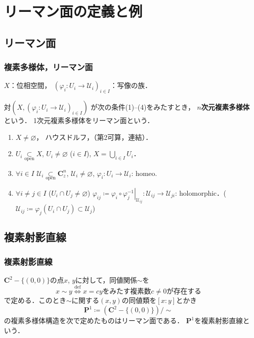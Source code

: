 \documentclass[dvipdfmx,12pt,aspectratio=169]{beamer}%
\newcommand{\cc}{\mathbf{C}}
\newcommand{\pp}{\mathbf{P}}
\newcommand{\mcal}{\mathcal}
\newcommand{\pphi}{\varphi} %
\newcommand{\UU}{\mcal{U}}
\newcommand{\emp}{\varnothing}
\newcommand{\ceq}{\coloneqq}
\newcommand{\sbs}{\subset}
\newcommand{\mapres}[2]{\left. #1 \right|_{#2}}
\begin{document}
\section{リーマン面の定義と例}
\subsection{リーマン面}

\begin{frame}
    \frametitle{複素多様体，リーマン面}

    \begin{Definition}
        $X$：位相空間，
        $(\pphi_i\colon U_i\to\UU_i)_{i\in I}$：写像の族．

        対$\left(X, (\pphi_i\colon U_i\to\UU_i)_{i\in I}\right)$
        が次の条件(1)--(4)をみたすとき，
        $n$\textbf{次元複素多様体}という．
        1次元複素多様体をリーマン面という．
        \begin{enumerate}
            \item $X\neq\varnothing$，
            ハウスドルフ，（第2可算，連結）．
            \item $U_i \underset{\text{open}}{\subset} X$,\quad 
            $U_i\neq\varnothing$ ($i\in I$),\quad 
            $X=\underset{i\in I}{\bigcup} U_i$．
            \item $\forall i\in I$\quad
            $\UU_i \underset{\text{open}}{\subset} \cc^n_z$,\quad 
            $\UU_i\neq\varnothing$, \quad
            $\pphi_{i}\colon U_i\to\UU_i$: homeo.
            \item $\forall i\neq j \in I$ ($U_i\cap U_j \neq \emp$)\quad
            $\pphi_{ij}\ceq 
            \mapres{\pphi_{i}\circ\pphi_{j}^{-1}}{\UU_{ij}}
            \colon 
            \UU_{ij}\to\UU_{ji}$: holomorphic．($\UU_{ij}\ceq \pphi_j(U_i\cap U_j)\sbs \UU_j$)
        \end{enumerate}
    \end{Definition}
\end{frame}

\subsection{複素射影直線}

\begin{frame}
    \frametitle{複素射影直線}

    $\cc^{2}-\{(0,0)\}$の点$x$, $y$に対して，同値関係${\sim}$を
\begin{equation*}
    x\sim y\overset{\text{def}}{\Longleftrightarrow}
    x = cy\text{をみたす複素数}c\neq 0\text{が存在する}
\end{equation*}
で定める．このとき$\sim$に関する$(x,y)$の同値類を$[x:y]$とかき
\begin{equation*}
    \pp^1\coloneqq \left(\cc^{2}-\{(0,0)\}\right)/{\sim}
\end{equation*}
の複素多様体構造を次で定めたものはリーマン面である．
$\pp^1$を複素射影直線という．
\end{frame}
\end{document}
